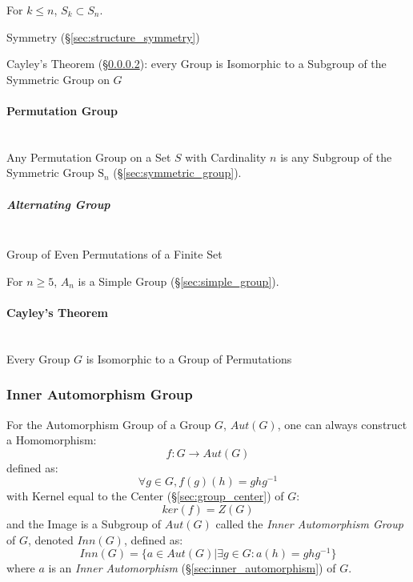 For $k \leq n$, $S_k \subset S_n$.

Symmetry (\S\ref{sec:structure_symmetry})

Cayley's Theorem (\S\ref{sec:cayleys_theorem}): every Group is
Isomorphic to a Subgroup of the Symmetric Group on $G$



\paragraph{Permutation Group}\label{sec:permutation_group}
\hfill \\

Any Permutation Group on a Set $S$ with Cardinality $n$ is any
Subgroup of the Symmetric Group $\mathrm{S}_n$
(\S\ref{sec:symmetric_group}).



\subparagraph{Alternating Group}\label{sec:alternating_group}
\hfill \\

Group of Even Permutations of a Finite Set

For $n \geq 5$, $A_n$ is a Simple Group (\S\ref{sec:simple_group}).



\paragraph{Cayley's Theorem}\label{sec:cayleys_theorem}
\hfill \\

Every Group $G$ is Isomorphic to a Group of Permutations



\subsubsection{Inner Automorphism Group}\label{sec:inner_automorphism_group}

For the Automorphism Group of a Group $G$, $Aut(G)$, one can always
construct a Homomorphism:
\[
    f : G \rightarrow Aut(G)
\]
defined as:
\[
    \forall g \in G, f (g) (h) = g h g^{-1}
\]
with Kernel equal to the Center (\S\ref{sec:group_center}) of $G$:
\[
    ker(f) = Z(G)
\]
and the Image is a Subgroup of $Aut(G)$ called the \emph{Inner
  Automorphism Group} of $G$, denoted $Inn(G)$, defined as:
\[
    Inn(G) = \{ a \in Aut(G) | \exists g \in G : a(h) = g h g^{-1} \}
\]
where $a$ is an \emph{Inner Automorphism}
(\S\ref{sec:inner_automorphism}) of $G$.

